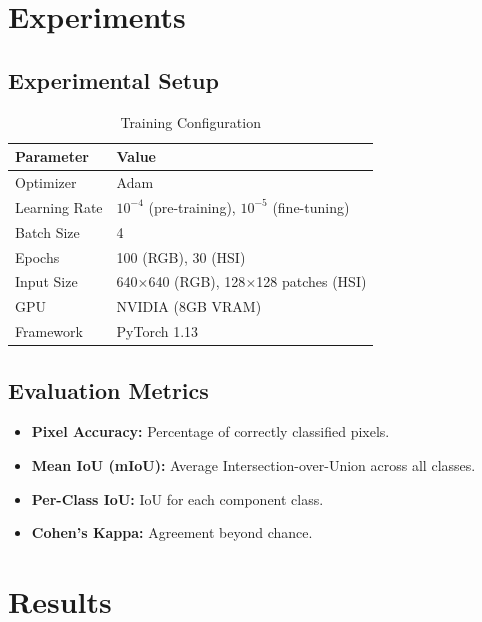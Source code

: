 \documentclass[12pt,a4paper]{article}
\begin{document}
\section{Experiments}

\subsection{Experimental Setup}

\begin{table}[H]
\centering
\caption{Training Configuration}
\label{tab:config}
\begin{tabular}{ll}
\toprule
\textbf{Parameter} & \textbf{Value} \\
\midrule
Optimizer & Adam \\
Learning Rate & $10^{-4}$ (pre-training), $10^{-5}$ (fine-tuning) \\
Batch Size & 4 \\
Epochs & 100 (RGB), 30 (HSI) \\
Input Size & 640$\times$640 (RGB), 128$\times$128 patches (HSI) \\
GPU & NVIDIA (8GB VRAM) \\
Framework & PyTorch 1.13 \\
\bottomrule
\end{tabular}
\end{table}

\subsection{Evaluation Metrics}

\begin{itemize}
    \item \textbf{Pixel Accuracy:} Percentage of correctly classified pixels.
    \item \textbf{Mean IoU (mIoU):} Average Intersection-over-Union across all classes.
    \item \textbf{Per-Class IoU:} IoU for each component class.
    \item \textbf{Cohen's Kappa:} Agreement beyond chance.
\end{itemize}

\section{Results}
\end{document}
